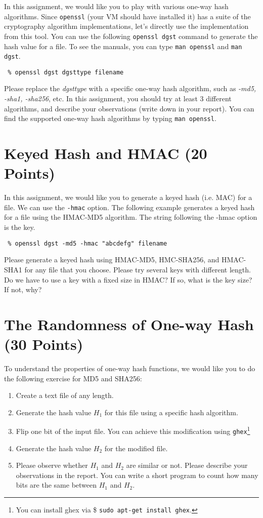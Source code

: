 \documentclass[11pt]{article}
\begin{document}
In this assignment, we would like you to play with various one-way hash algorithms. Since \texttt{openssl} (your VM should have installed it) has a suite of the cryptography algorithm implementations, let's directly use the implementation from this tool. You can use the following \texttt{openssl dgst} command to generate the hash value for a file. To see the manuals, you can type {\tt man openssl} and {\tt man dgst}.
\begin{lstlisting}
 % openssl dgst dgsttype filename
\end{lstlisting}
\vspace{-6mm}
Please replace the \textit{dgsttype} with a specific one-way hash algorithm, such as \textit{-md5, -sha1, -sha256},
etc. In this assignment, you should try at least 3 different algorithms, and describe your observations (write down in your report). You can find the supported one-way hash algorithms by typing {\tt man openssl}.



\section{Keyed Hash and HMAC (20 Points)}
In this assignment, we would like you to generate a keyed hash (i.e. MAC) for a file. We can use the {\tt -hmac} option. The following example generates a keyed hash for a file using the HMAC-MD5 algorithm. The string following the -hmac option is the key.

\begin{lstlisting}
 % openssl dgst -md5 -hmac "abcdefg" filename
\end{lstlisting}
\vspace{-6mm}

Please generate a keyed hash using HMAC-MD5, HMC-SHA256, and HMAC-SHA1 for any file that
you choose. Please try several keys with different length. Do we have to use a key with a fixed size in
HMAC? If so, what is the key size? If not, why?

\section{The Randomness of One-way Hash (30 Points)}
To understand the properties of one-way hash functions, we would like you to do the following exercise for MD5
and SHA256:
\begin{enumerate}
\item Create a text file of any length.
\item Generate the hash value $H_1$ for this file using a specific hash algorithm.
\item Flip one bit of the input file. You can achieve this modification using {\tt ghex}\footnote{You can install ghex via \$ {\tt sudo apt-get install ghex}.}
\item Generate the hash value $H_2$ for the modified file.
\item Please observe whether $H_1$ and $H_2$ are similar or not. Please describe your observations in the report.
You can write a short program to count how many bits are the same between $H_1$ and $H_2$.
\end{enumerate}
\end{document}
